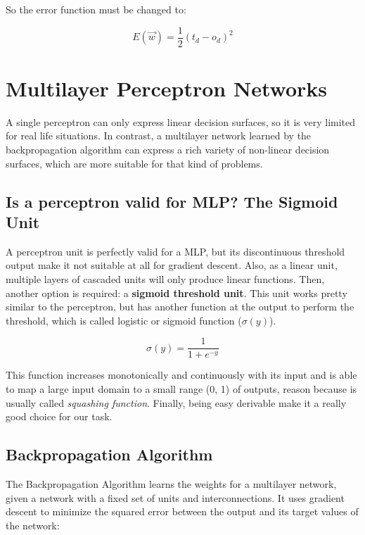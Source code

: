 	So the error function must be changed to:

	\begin{equation}
		\label{error_function_stoc_square}
		E(\vec{w}) = \frac{1}{2} (t_d-o_d)^2 
	\end{equation}

\section{Multilayer Perceptron Networks}
A single perceptron can only express linear decision surfaces, so it is very limited for real life situations. In contrast, a multilayer network learned by the backpropagation algorithm can express a rich variety of non-linear decision surfaces, which are more suitable for that kind of problems.

	\subsection{Is a perceptron valid for MLP? The Sigmoid Unit}
	A perceptron unit is perfectly valid for a MLP, but its discontinuous threshold output make it not suitable at all for gradient descent. Also, as a linear unit, multiple layers of cascaded units will only produce linear functions. Then, another option is required: a \textbf{sigmoid threshold unit}. This unit works pretty similar to the perceptron, but has another function at the output to perform the threshold, which is called logistic or sigmoid function ($\sigma(y)$).

		\begin{equation}
			\label{sigmoid_function}
			\sigma(y) = \frac{1}{1+e^{-y}}
		\end{equation}

	This function increases monotonically and continuously with its input and is able to map a large input domain to a small range (0, 1) of outputs, reason because is usually called \textit{squashing function}. Finally, being easy derivable make it a really good choice for our task. 


	\subsection{Backpropagation Algorithm}
	The Backpropagation Algorithm learns the weights for a multilayer  network, given a network with a fixed set of units and interconnections. It uses gradient descent to minimize the squared error between the output and its target values of the network:

